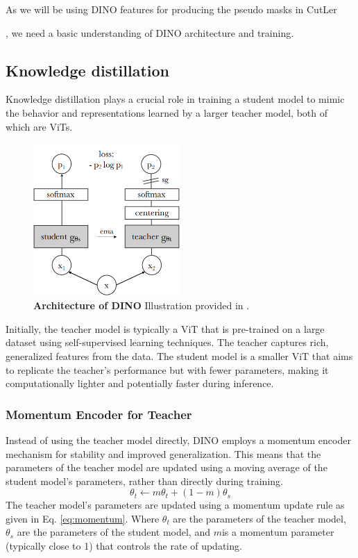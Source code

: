 As we will be using DINO features for producing the pseudo masks in CutLer {\cite{wang2023cut}, we need a basic understanding of DINO architecture and training.

\subsection{Knowledge distillation}
 Knowledge distillation plays a crucial role in training a student model to mimic the behavior and representations learned by a larger teacher model, both of which are ViTs. 
 
\begin{figure}
	\centering
	\includegraphics[width=0.5\textwidth]{Images/main/dino.png}
	\caption[\textbf{DINO Architecture }]{\textbf{Architecture of DINO} Illustration provided in 
		\cite{caron2021emerging}.}
	\label{fig:dino}
\end{figure} 
 
 Initially, the teacher model is typically a ViT that is pre-trained on a large dataset using self-supervised learning techniques. The teacher captures rich, generalized features from the data. The student model is a smaller ViT that aims to replicate the teacher's performance but with fewer parameters, making it computationally lighter and potentially faster during inference.
 
\subsubsection{Momentum Encoder for Teacher}
Instead of using the teacher model directly, DINO employs a momentum encoder mechanism for stability and improved generalization. This means that the parameters of the teacher model are updated using a moving average of the student model's parameters, rather than directly during training.
\begin{equation}
	\label{eq:momentum}
	\theta_t \leftarrow m \theta_t + (1 - m) \theta_s
\end{equation}
The teacher model's parameters are updated using a momentum update rule as given in Eq. \ref{eq:momentum}. Where \(\theta_t\) are the parameters of the teacher model, \(\theta_s\) are the parameters of the student model, and \(m\)is a momentum parameter (typically close to 1) that controls the rate of updating.

}
